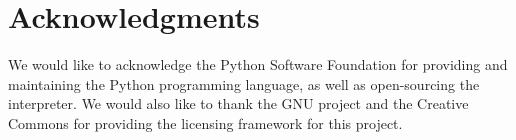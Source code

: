 
\section{Acknowledgments}
We would like to acknowledge the Python Software Foundation for providing and
maintaining the Python programming language, as well as open-sourcing the
interpreter. We would also like to thank the GNU project and the Creative
Commons for providing the licensing framework for this project. 
